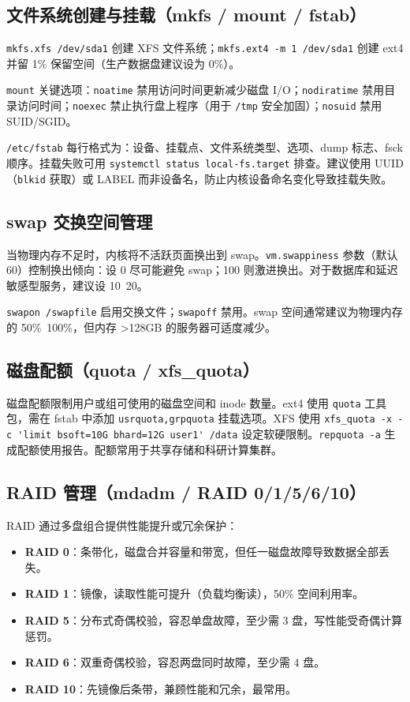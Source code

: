 \documentclass[12pt,UTF8]{ctexbook}
\begin{document}
    \subsection{文件系统创建与挂载（mkfs / mount / fstab）}

\verb|mkfs.xfs /dev/sda1| 创建 XFS 文件系统；\verb|mkfs.ext4 -m 1 /dev/sda1| 创建 ext4 并留 1\% 保留空间（生产数据盘建议设为 0\%）。

\verb|mount| 关键选项：\verb|noatime| 禁用访问时间更新减少磁盘 I/O；\verb|nodiratime| 禁用目录访问时间；\verb|noexec| 禁止执行盘上程序（用于 \verb|/tmp| 安全加固）；\verb|nosuid| 禁用 SUID/SGID。

\verb|/etc/fstab| 每行格式为：设备、挂载点、文件系统类型、选项、dump 标志、fsck 顺序。挂载失败可用 \verb|systemctl status local-fs.target| 排查。建议使用 UUID（\verb|blkid| 获取）或 LABEL 而非设备名，防止内核设备命名变化导致挂载失败。

    \subsection{swap 交换空间管理}

当物理内存不足时，内核将不活跃页面换出到 swap。\verb|vm.swappiness| 参数（默认 60）控制换出倾向：设 0 尽可能避免 swap；100 则激进换出。对于数据库和延迟敏感型服务，建议设 10~20。

\verb|swapon /swapfile| 启用交换文件；\verb|swapoff| 禁用。swap 空间通常建议为物理内存的 50\%~100\%，但内存 >128GB 的服务器可适度减少。

    \subsection{磁盘配额（quota / xfs\_quota）}

磁盘配额限制用户或组可使用的磁盘空间和 inode 数量。ext4 使用 \verb|quota| 工具包，需在 fstab 中添加 \verb|usrquota,grpquota| 挂载选项。XFS 使用 \verb|xfs_quota -x -c 'limit bsoft=10G bhard=12G user1' /data| 设定软硬限制。\verb|repquota -a| 生成配额使用报告。配额常用于共享存储和科研计算集群。

    \subsection{RAID 管理（mdadm / RAID 0/1/5/6/10）}

RAID 通过多盘组合提供性能提升或冗余保护：
\begin{itemize}
	\item \textbf{RAID 0}：条带化，磁盘合并容量和带宽，但任一磁盘故障导致数据全部丢失。
	\item \textbf{RAID 1}：镜像，读取性能可提升（负载均衡读），50\% 空间利用率。
	\item \textbf{RAID 5}：分布式奇偶校验，容忍单盘故障，至少需 3 盘，写性能受奇偶计算惩罚。
	\item \textbf{RAID 6}：双重奇偶校验，容忍两盘同时故障，至少需 4 盘。
	\item \textbf{RAID 10}：先镜像后条带，兼顾性能和冗余，最常用。
\end{itemize}
\end{document}
